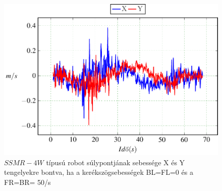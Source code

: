 \begin{figure}[H]
  \includegraphics{tikz/Left0Right50e.pdf}
  \caption{$SSMR-4W$ típusú robot súlypontjának sebessége X és Y tengelyekre bontva, ha a kerékszögsebességek BL=FL=0 és a FR=BR= 50\degree/s}
  \label{fig:Left0Right50e}  
\end{figure}










